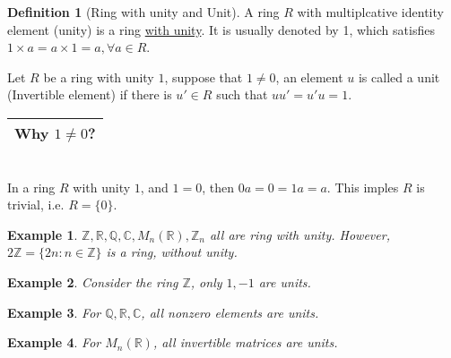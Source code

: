 \documentclass{article}
\theoremstyle{MyNonumberplain}
\theoremstyle{break}
\theoremstyle{break}
\newtheorem{example}{Example}[section]
\theoremstyle{break}
\theoremstyle{definition}
\theoremstyle{break}
\newtheorem{definition}{Definition}[section]
\begin{document}
\begin{defbox}
    \begin{definition}[Ring with unity and Unit]
        A ring $R$ with multiplcative identity element (unity) is a ring
        {\underline{with unity}}. It is usually denoted by 1, which satisfies $1
        \times a = a \times 1 = a, \forall a \in R$.\bigskip
        
        Let $R$ be a ring with unity $1$, suppose that $1 \neq 0$, an element $u$ is
        called a unit (Invertible element) if there is $u' \in R$ such that $u u' = u'
        u = 1$.\bigskip
        
        \begin{tabular}{|c|}
          \hline
          Why $1 \neq 0$?\\
          \hline
        \end{tabular}\\
        
        In a ring $R$ with unity $1$, and $1 = 0$, then $0 a = 0 = 1 a = a$. This
        imples $R$ is trivial, i.e. $R = \{ 0 \}$.
    \end{definition}
\end{defbox}

\begin{expbox}
    \begin{example}
        $\mathbb{Z}, \mathbb{R}, \mathbb{Q}, \mathbb{C}, M_n (\mathbb{R}),
        \mathbb{Z}_n$ all are ring with unity. However, $2\mathbb{Z}= \{ 2 n : n \in
        \mathbb{Z} \}$ is a ring, without unity.
    \end{example}
\end{expbox}

\begin{expbox}
    \begin{example}
        Consider the ring $\mathbb{Z}$, only $1, - 1$ are units.
    \end{example}
\end{expbox}

\begin{expbox}
    \begin{example}
        For $\mathbb{Q}, \mathbb{R}, \mathbb{C}$, all nonzero elements are units.
    \end{example}
\end{expbox}

\begin{expbox}
    \begin{example}
        For $M_n (\mathbb{R})$, all invertible matrices are units.
    \end{example}
\end{expbox}
\end{document}
